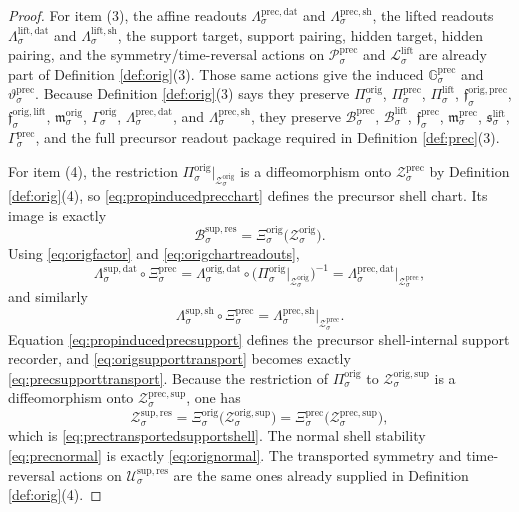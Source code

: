 \documentclass[11pt]{article}
\newcommand{\ResSpace}[1]{\mathcal U_{#1}^{\mathrm{sup,res}}}
\newcommand{\ResBody}[1]{\mathcal B_{#1}^{\mathrm{sup,res}}}
\newcommand{\ResData}[1]{\Lambda_{#1}^{\mathrm{sup,dat}}}
\newcommand{\ResShellMap}[1]{\Lambda_{#1}^{\mathrm{sup,sh}}}
\newcommand{\ResShellSet}[1]{\mathcal Z_{#1}^{\mathrm{sup,res}}}
\newcommand{\LiftSpace}[1]{\mathcal L_{#1}^{\mathrm{lift}}}
\newcommand{\LiftBody}[1]{\mathcal B_{#1}^{\mathrm{lift}}}
\newcommand{\LiftProj}[1]{\Pi_{#1}^{\mathrm{lift}}}
\newcommand{\LiftSelect}[1]{\mathfrak s_{#1}^{\mathrm{lift}}}
\newcommand{\LiftData}[1]{\Lambda_{#1}^{\mathrm{lift,dat}}}
\newcommand{\LiftShellMap}[1]{\Lambda_{#1}^{\mathrm{lift,sh}}}
\newcommand{\PrecSpace}[1]{\mathcal P_{#1}^{\mathrm{prec}}}
\newcommand{\PrecBody}[1]{\mathcal B_{#1}^{\mathrm{prec}}}
\newcommand{\PrecProj}[1]{\Pi_{#1}^{\mathrm{prec}}}
\newcommand{\PrecLiftMin}[1]{\mathfrak f_{#1}^{\mathrm{prec}}}
\newcommand{\PrecSubMin}[1]{\mathfrak m_{#1}^{\mathrm{prec}}}
\newcommand{\PrecSection}[1]{\Gamma_{#1}^{\mathrm{prec}}}
\newcommand{\PrecData}[1]{\Lambda_{#1}^{\mathrm{prec,dat}}}
\newcommand{\PrecShellMap}[1]{\Lambda_{#1}^{\mathrm{prec,sh}}}
\newcommand{\PrecSym}[1]{\mathbb G_{#1}^{\mathrm{prec}}}
\newcommand{\PrecTime}[1]{\vartheta_{#1}^{\mathrm{prec}}}
\newcommand{\PrecShellSet}[1]{\mathcal Z_{#1}^{\mathrm{prec}}}
\newcommand{\PrecChart}[1]{\Xi_{#1}^{\mathrm{prec}}}
\newcommand{\PrecSupportShell}[1]{\mathcal Z_{#1}^{\mathrm{prec,sup}}}
\newcommand{\OrigProj}[1]{\Pi_{#1}^{\mathrm{orig}}}
\newcommand{\OrigPrecMin}[1]{\mathfrak f_{#1}^{\mathrm{orig,prec}}}
\newcommand{\OrigLiftMin}[1]{\mathfrak f_{#1}^{\mathrm{orig,lift}}}
\newcommand{\OrigSubMin}[1]{\mathfrak m_{#1}^{\mathrm{orig}}}
\newcommand{\OrigSection}[1]{\Gamma_{#1}^{\mathrm{orig}}}
\newcommand{\OrigData}[1]{\Lambda_{#1}^{\mathrm{orig,dat}}}
\newcommand{\OrigShellSet}[1]{\mathcal Z_{#1}^{\mathrm{orig}}}
\newcommand{\OrigChart}[1]{\Xi_{#1}^{\mathrm{orig}}}
\newcommand{\OrigSupportShell}[1]{\mathcal Z_{#1}^{\mathrm{orig,sup}}}
\begin{document}
\begin{proof}
For item (3), the affine readouts \(\PrecData{\sigma}\) and \(\PrecShellMap{\sigma}\), the lifted readouts \(\LiftData{\sigma}\) and \(\LiftShellMap{\sigma}\), the support target, support pairing, hidden target, hidden pairing, and the symmetry/time-reversal actions on \(\PrecSpace{\sigma}\) and \(\LiftSpace{\sigma}\) are already part of Definition \ref{def:orig}(3). Those same actions give the induced \(\PrecSym{\sigma}\) and \(\PrecTime{\sigma}\). Because Definition \ref{def:orig}(3) says they preserve \(\OrigProj{\sigma}\), \(\PrecProj{\sigma}\), \(\LiftProj{\sigma}\), \(\OrigPrecMin{\sigma}\), \(\OrigLiftMin{\sigma}\), \(\OrigSubMin{\sigma}\), \(\OrigSection{\sigma}\), \(\PrecData{\sigma}\), and \(\PrecShellMap{\sigma}\), they preserve \(\PrecBody{\sigma}\), \(\LiftBody{\sigma}\), \(\PrecLiftMin{\sigma}\), \(\PrecSubMin{\sigma}\), \(\LiftSelect{\sigma}\), \(\PrecSection{\sigma}\), and the full precursor readout package required in Definition \ref{def:prec}(3).

For item (4), the restriction \(\OrigProj{\sigma}\big|_{\OrigShellSet{\sigma}}\) is a diffeomorphism onto \(\PrecShellSet{\sigma}\) by Definition \ref{def:orig}(4), so \eqref{eq:propinducedprecchart} defines the precursor shell chart. Its image is exactly
\[
\ResBody{\sigma}
=
\OrigChart{\sigma}\bigl(\OrigShellSet{\sigma}\bigr).
\]
Using \eqref{eq:origfactor} and \eqref{eq:origchartreadouts},
\[
\ResData{\sigma}\circ\PrecChart{\sigma}
=
\OrigData{\sigma}\circ
\bigl(\OrigProj{\sigma}\big|_{\OrigShellSet{\sigma}}\bigr)^{-1}
=
\PrecData{\sigma}\big|_{\PrecShellSet{\sigma}},
\]
and similarly
\[
\ResShellMap{\sigma}\circ\PrecChart{\sigma}
=
\PrecShellMap{\sigma}\big|_{\PrecShellSet{\sigma}}.
\]
Equation \eqref{eq:propinducedprecsupport} defines the precursor shell-internal support recorder, and \eqref{eq:origsupporttransport} becomes exactly \eqref{eq:precsupporttransport}. Because the restriction of \(\OrigProj{\sigma}\) to \(\OrigSupportShell{\sigma}\) is a diffeomorphism onto \(\PrecSupportShell{\sigma}\), one has
\[
\ResShellSet{\sigma}
=
\OrigChart{\sigma}\bigl(\OrigSupportShell{\sigma}\bigr)
=
\PrecChart{\sigma}\bigl(\PrecSupportShell{\sigma}\bigr),
\]
which is \eqref{eq:prectransportedsupportshell}. The normal shell stability \eqref{eq:precnormal} is exactly \eqref{eq:orignormal}. The transported symmetry and time-reversal actions on \(\ResSpace{\sigma}\) are the same ones already supplied in Definition \ref{def:orig}(4).


\end{proof}
\end{document}
